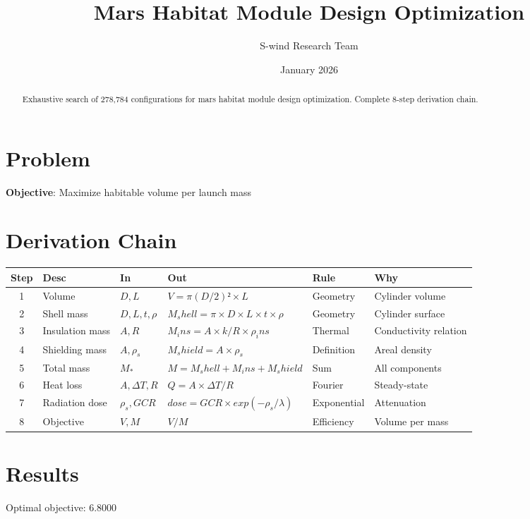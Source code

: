 \documentclass[11pt]{article}
\title{Mars Habitat Module Design Optimization}
\author{S-wind Research Team}
\date{January 2026}
\begin{document}
\maketitle

\begin{abstract}
Exhaustive search of 278,784 configurations for mars habitat module design optimization. Complete 8-step derivation chain.
\end{abstract}

\section{Problem}
\textbf{Objective}: Maximize habitable volume per launch mass

\section{Derivation Chain}
\begin{longtable}{|c|p{2cm}|p{2cm}|p{3cm}|p{2cm}|p{3cm}|}
\hline
Step & Desc & In & Out & Rule & Why\\\hline\endhead
1 & Volume & $D, L$ & $V = π(D/2)²×L$ & Geometry & Cylinder volume\\\hline
2 & Shell mass & $D, L, t, ρ$ & $M_shell = π×D×L×t×ρ$ & Geometry & Cylinder surface\\\hline
3 & Insulation mass & $A, R$ & $M_ins = A × k/R × ρ_ins$ & Thermal & Conductivity relation\\\hline
4 & Shielding mass & $A, ρ_s$ & $M_shield = A × ρ_s$ & Definition & Areal density\\\hline
5 & Total mass & $M_*$ & $M = M_shell + M_ins + M_shield$ & Sum & All components\\\hline
6 & Heat loss & $A, ΔT, R$ & $Q = A × ΔT / R$ & Fourier & Steady-state\\\hline
7 & Radiation dose & $ρ_s, GCR$ & $dose = GCR × exp(-ρ_s/λ)$ & Exponential & Attenuation\\\hline
8 & Objective & $V, M$ & $V/M$ & Efficiency & Volume per mass\\\hline
\end{longtable}

\section{Results}
Optimal objective: 6.8000
\end{document}
